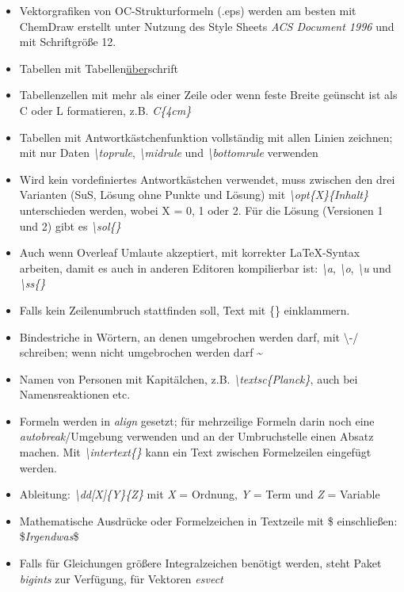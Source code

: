 \documentclass[./main.tex]{subfiles}
\begin{document}
\begin{itemize}
    \item Vektorgrafiken von OC-Strukturformeln (.eps) werden am besten mit ChemDraw erstellt unter Nutzung des Style Sheets \textit{ACS Document 1996} und mit Schriftgr\"o\ss{}e 12. 
    \item Tabellen mit Tabellen\underline{\"uber}schrift 
    \item Tabellenzellen mit mehr als einer Zeile oder wenn feste Breite ge\"unscht ist als C oder L formatieren, z.B. \textit{C\{4cm\}}
    \item Tabellen mit Antwortk\"astchenfunktion vollst\"andig mit allen Linien zeichnen; mit nur Daten \textit{\textbackslash toprule}, \textit{\textbackslash midrule} und \textit{\textbackslash bottomrule} verwenden
    \item Wird kein vordefiniertes Antwortk\"astchen verwendet, muss zwischen den drei Varianten (SuS, L\"osung ohne Punkte und L\"osung) mit \textit{\textbackslash opt\{X\}\{Inhalt\}} unterschieden werden, wobei X = 0, 1 oder 2. F\"ur die L\"osung (Versionen 1 und 2) gibt es \textit{\textbackslash sol\{\}}
    \item Auch wenn Overleaf Umlaute akzeptiert, mit korrekter \LaTeX-Syntax arbeiten, damit es auch in anderen Editoren kompilierbar ist: \textit{\textbackslash\grqq{}a}, \textit{\textbackslash\grqq{}o}, \textit{\textbackslash\grqq{}u} und \textit{\textbackslash ss\{\}}
    \item Falls kein Zeilenumbruch stattfinden soll, Text mit \{\} einklammern.  
    \item Bindestriche in W\"ortern, an denen umgebrochen werden darf, mit \textbackslash -/ schreiben; wenn nicht umgebrochen werden darf \grqq{}\textasciitilde
    \item Namen von Personen mit Kapit\"alchen, z.B. \textit{\textbackslash textsc\{Planck\}}, auch bei Namensreaktionen etc.
    \item Formeln werden in \textit{align} gesetzt; f\"ur mehrzeilige Formeln darin noch eine \textit{autobreak}\-/Umgebung verwenden und an der Umbruchstelle einen Absatz machen. Mit \textit{\textbackslash intertext\{\}} kann ein Text zwischen Formelzeilen eingef\"ugt werden.  
    \item Ableitung: \textit{\textbackslash dd[X]\{Y\}\{Z\}} mit \textit{X} = Ordnung, \textit{Y} = Term und \textit{Z} = Variable  
    \item Mathematische Ausdr\"ucke oder Formelzeichen in Textzeile mit \$ einschlie\ss{}en:  \$\textit{Irgendwas}\$ 
    \item Falls f\"ur Gleichungen gr\"o\ss{}ere Integralzeichen ben\"otigt werden, steht Paket \textit{bigints} zur Verf\"ugung, f\"ur Vektoren \textit{esvect}

\end{itemize}
\end{document}
